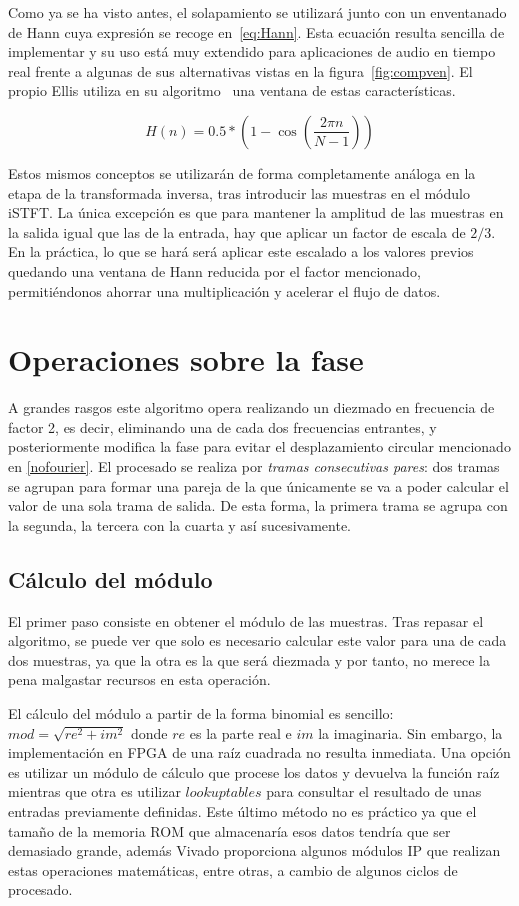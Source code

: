 Como ya se ha visto antes, el solapamiento se utilizará junto con un enventanado de Hann cuya expresión se recoge en~\ref{eq:Hann}. Esta ecuación resulta sencilla de implementar y su uso está muy extendido para aplicaciones de audio en tiempo real frente a algunas de sus alternativas vistas en la figura~\ref{fig:compven}. El propio Ellis utiliza en su algoritmo~\cite{Ellis} una ventana de estas características.

\begin{equation}
\label{eq:Hann}
 H(n) = 0.5 * \left(1 - \cos\left(\frac{2\pi n}{N - 1}\right)\right)
 \end{equation} 
 
Estos mismos conceptos se utilizarán de forma completamente análoga en la etapa de la transformada inversa, tras introducir las muestras en el módulo iSTFT. La única excepción es que para mantener la amplitud de las muestras en la salida igual que las de la entrada, hay que aplicar un factor de escala de $2/3$. En la práctica, lo que se hará será aplicar este escalado a los valores previos quedando una ventana de Hann reducida por el factor mencionado, permitiéndonos ahorrar una multiplicación y acelerar el flujo de datos.

\section{Operaciones sobre la fase}
A grandes rasgos este algoritmo opera realizando un diezmado en frecuencia de factor 2, es decir, eliminando una de cada dos frecuencias entrantes, y posteriormente modifica la fase para evitar el desplazamiento circular mencionado en \ref{nofourier}. El procesado se realiza por \emph{tramas consecutivas pares}: dos tramas se agrupan para formar una pareja de la que únicamente se va a poder calcular el valor de una sola trama de salida. De esta forma, la primera trama se agrupa con la segunda, la tercera con la cuarta y así sucesivamente.

\subsection{Cálculo del módulo}
El primer paso consiste en obtener el módulo de las muestras. Tras repasar el algoritmo, se puede ver que solo es necesario calcular este valor para una de cada dos muestras, ya que la otra es la que será diezmada y por tanto, no merece la pena malgastar recursos en esta operación. 

El cálculo del módulo a partir de la forma binomial es sencillo: $mod = \sqrt{re^{2}+im^{2}}$ donde $re$ es la parte real e $im$ la imaginaria. Sin embargo, la implementación en FPGA de una raíz cuadrada no resulta inmediata. Una opción es utilizar un módulo de cálculo que procese los datos y devuelva la función raíz mientras que otra es utilizar $lookup tables$ para consultar el resultado de unas entradas previamente definidas. Este último método no es práctico ya que el tamaño de la memoria ROM que almacenaría esos datos tendría que ser demasiado grande, además Vivado proporciona algunos módulos IP que realizan estas operaciones matemáticas, entre otras, a cambio de algunos ciclos de procesado.

